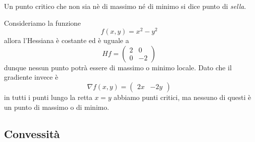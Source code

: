 \documentclass[11pt]{scrartcl}
\begin{document}
	\begin{definition}
		Un punto critico che non sia nè di massimo né di minimo si dice punto di \textit{sella}.
	\end{definition}
	\begin{example}
		Consideriamo la funzione
		$$f(x,y)=x^2-y^2$$
		allora l'Hessiana è costante ed è uguale a
		$$Hf=
		\begin{pmatrix}
			2 & 0 \\
			0 & -2
		\end{pmatrix}
		$$
		dunque nessun punto potrà essere di massimo o minimo locale. Dato che il gradiente invece è
		$$\nabla f (x,y)=\begin{pmatrix}
			2x & -2y
		\end{pmatrix}$$
		in tutti i punti lungo la retta $x=y$ abbiamo punti critici, ma nessuno di questi è un punto di massimo o di minimo.
	\end{example}
	
	\subsection{Convessità}
	
\end{document}
